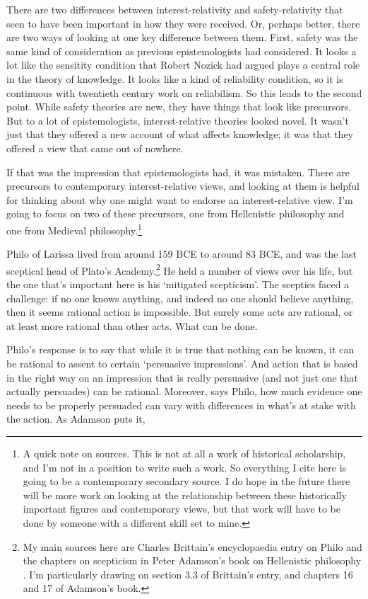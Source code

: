 \documentclass[
  11pt,
]{book}
\begin{document}
There are two differences between interest-relativity and safety-relativity that seen to have been important in how they were received. Or, perhaps better, there are two ways of looking at one key difference between them. First, safety was the same kind of consideration as previous epistemologists had considered. It looks a lot like the sensitity condition that Robert Nozick \citeyearpar{Nozick1981} had argued plays a central role in the theory of knowledge. It looks like a kind of reliability condition, so it is continuous with twentieth century work on reliabilism. So this leads to the second point. While safety theories are new, they have things that look like precursors. But to a lot of epistemologists, interest-relative theories looked novel. It wasn't just that they offered a new account of what affects knowledge; it was that they offered a view that came out of nowhere.

If that was the impression that epistemologists had, it was mistaken. There are precursors to contemporary interest-relative views, and looking at them is helpful for thinking about why one might want to endorse an interest-relative view. I'm going to focus on two of these precursors, one from Hellenistic philosophy and one from Medieval philosophy.\footnote{A quick note on sources. This is not at all a work of historical scholarship, and I'm not in a position to write such a work. So everything I cite here is going to be a contemporary secondary source. I do hope in the future there will be more work on looking at the relationship between these historically important figures and contemporary views, but that work will have to be done by someone with a different skill set to mine.}

Philo of Larissa lived from around 159 BCE to around 83 BCE, and was the last sceptical head of Plato's Academy.\footnote{My main sources here are Charles Brittain's encyclopaedia entry on Philo \citep{Brittain2021} and the chapters on scepticism in Peter Adamson's book on Hellenistic philosophy \citep{Adamson2015}. I'm particularly drawing on section 3.3 of Brittain's entry, and chapters 16 and 17 of Adamson's book.} He held a number of views over his life, but the one that's important here is his `mitigated scepticism'. The sceptics faced a challenge: if no one knows anything, and indeed no one should believe anything, then it seems rational action is impossible. But surely some acts are rational, or at least more rational than other acts. What can be done.

Philo's response is to say that while it is true that nothing can be known, it can be rational to assent to certain `persuasive impressions'. And action that is based in the right way on an impression that is really persuasive (and not just one that actually persuades) can be rational. Moreover, says Philo, how much evidence one needs to be properly persuaded can vary with differences in what's at stake with the action. As Adamson puts it,
\end{document}
